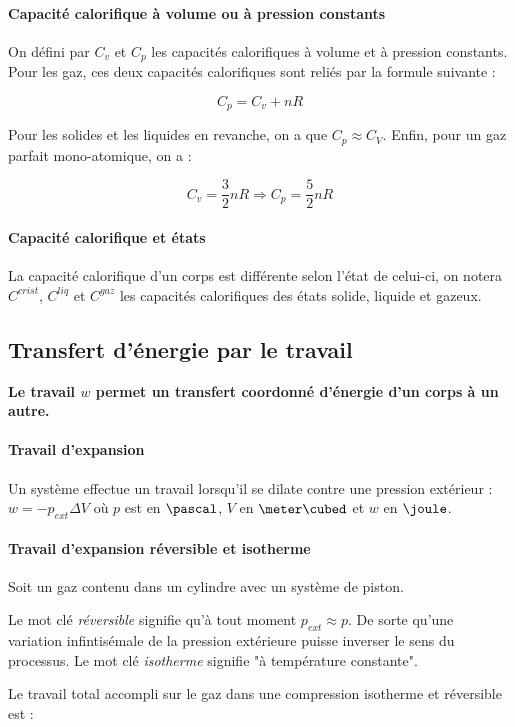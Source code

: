 \paragraph{Capacité calorifique à volume ou à pression constants}
On défini par $C_v$ et $C_p$ les capacités calorifiques à volume et à pression constants.
Pour les gaz, ces deux capacités calorifiques sont reliés par la formule suivante :

$$C_p = C_v + nR$$

Pour les solides et les liquides en revanche, on a que $C_p \approx C_V$.
Enfin, pour un gaz parfait mono-atomique, on a : 

$$C_v = \frac{3}{2}nR \Rightarrow C_p = \frac{5}{2}nR$$

\paragraph{Capacité calorifique et états}
La capacité calorifique d'un corps est différente selon l'état de celui-ci,
on notera $C^{crist}$, $C^{liq}$ et $C^{gaz}$ les capacités calorifiques
des états solide, liquide et gazeux.

\subsection{Transfert d'énergie par le travail}
\textbf{Le travail $w$ permet un transfert coordonné d'énergie d'un corps à un autre.}

\paragraph{Travail d'expansion}
Un système effectue un travail lorsqu'il se dilate contre une pression extérieur :
$w = -p_{ext} \Delta V$ où $p$ est en $\pascal$, $V$ en $\meter\cubed$ et $w$ en $\joule$.

\paragraph{Travail d'expansion réversible et isotherme}
Soit un gaz contenu dans un cylindre avec un système de piston.

Le mot clé \textit{réversible} signifie qu'à tout moment $p_{ext} \approx p$. De sorte
qu'une variation infintisémale de la pression extérieure puisse inverser le sens du 
processus. Le mot clé \textit{isotherme} signifie "à température constante".

Le travail total accompli sur le gaz dans une compression isotherme et réversible est :

